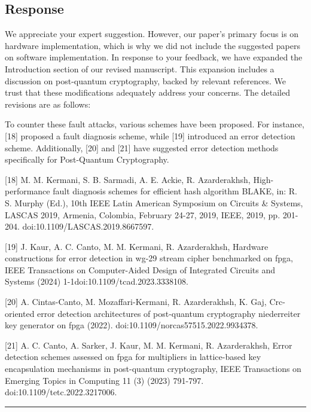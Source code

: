 \subsection{Response}

We appreciate your expert suggestion. However, our paper's primary focus is on hardware implementation, which is why we did not include the suggested papers on software implementation. In response to your feedback, we have expanded the Introduction section of our revised manuscript. This expansion includes a discussion on post-quantum cryptography, backed by relevant references. We trust that these modifications adequately address your concerns. The detailed revisions are as follows:

\color{blue}

To counter these fault attacks, various schemes have been proposed. For instance, [18] proposed a fault diagnosis scheme, while [19] introduced an error detection scheme. Additionally, [20] and [21] have suggested error detection methods specifically for Post-Quantum Cryptography.

	[18] M. M. Kermani, S. B. Sarmadi, A. E. Ackie, R. Azarderakhsh, High-performance fault diagnosis schemes for efficient hash algorithm BLAKE, in: R. S. Murphy (Ed.), 10th IEEE Latin American Symposium on Circuits \& Systems, LASCAS 2019, Armenia, Colombia, February 24-27, 2019, IEEE, 2019, pp. 201-204. doi:10.1109/LASCAS.2019.8667597.

[19] J. Kaur, A. C. Canto, M. M. Kermani, R. Azarderakhsh, Hardware constructions for error detection in wg-29 stream cipher benchmarked on fpga, IEEE Transactions on Computer-Aided Design of Integrated Circuits and Systems (2024) 1-1doi:10.1109/tcad.2023.3338108.

[20] A. Cintas-Canto, M. Mozaffari-Kermani, R. Azarderakhsh, K. Gaj, Crc-oriented error detection architectures of post-quantum cryptography niederreiter key generator on fpga (2022). doi:10.1109/norcas57515.2022.9934378.

[21] A. C. Canto, A. Sarker, J. Kaur, M. M. Kermani, R. Azarderakhsh, Error detection schemes assessed on fpga for multipliers in lattice-based key encapsulation mechanisms in post-quantum cryptography, IEEE Transactions on Emerging Topics in Computing 11 (3) (2023) 791-797. doi:10.1109/tetc.2022.3217006.

\color{black}

\noindent\rule{\linewidth}{2.0pt}

